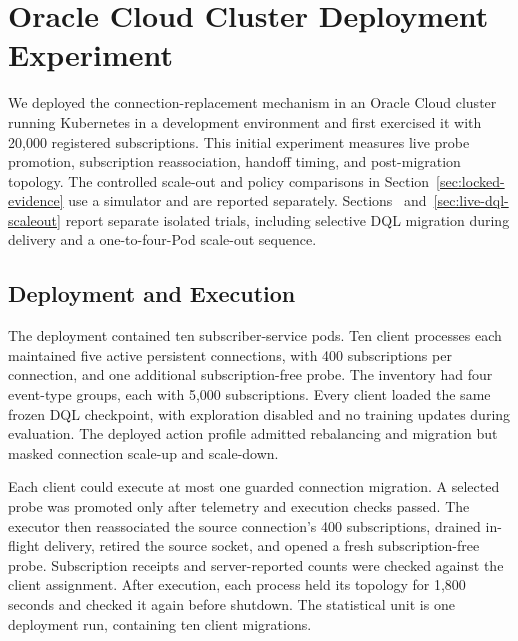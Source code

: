 \section{Oracle Cloud Cluster Deployment Experiment}
\label{sec:mumbai-experiment}

We deployed the connection-replacement mechanism in an Oracle Cloud cluster
running Kubernetes in a development environment and first exercised it with 20,000
registered subscriptions. This initial experiment
measures live probe promotion, subscription reassociation, handoff timing, and
post-migration topology. The controlled scale-out and policy comparisons in
Section~\ref{sec:locked-evidence} use a simulator and are reported separately.
Sections~ and~\ref{sec:live-dql-scaleout} report
separate isolated trials, including selective DQL migration during delivery
and a one-to-four-Pod scale-out sequence.

\subsection{Deployment and Execution}

The deployment contained ten subscriber-service pods. Ten client processes
each maintained five active persistent connections, with 400 subscriptions per
connection, and one additional subscription-free probe. The inventory had
four event-type groups, each with 5,000 subscriptions. Every client loaded the
same frozen DQL checkpoint, with exploration disabled and no training updates
during evaluation. The deployed action profile admitted rebalancing and
migration but masked connection scale-up and scale-down.

Each client could execute at most one guarded connection migration. A selected
probe was promoted only after telemetry and execution checks passed. The
executor then reassociated the source connection's 400 subscriptions, drained
in-flight delivery, retired the source socket, and opened a fresh
subscription-free probe. Subscription receipts and server-reported counts
were checked against the client assignment. After execution, each process
held its topology for 1,800 seconds and checked it again before shutdown.
The statistical unit is one deployment run, containing ten client migrations.

